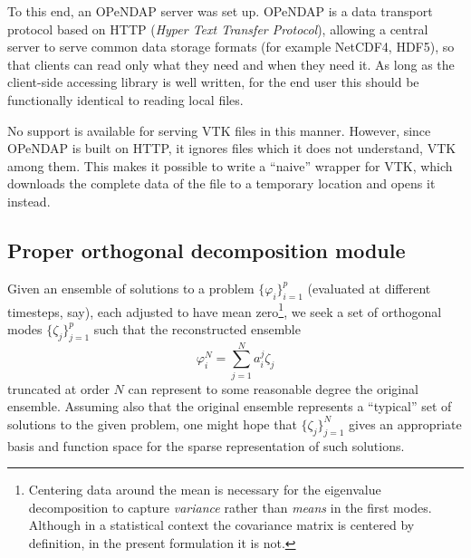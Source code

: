 \documentclass[3p,times,procedia]{elsarticle}
\begin{document}
To this end, an OPeNDAP server was set up. OPeNDAP is a data transport protocol
based on HTTP (\emph{Hyper Text Transfer Protocol}), allowing a central server
to serve common data storage formats (for example NetCDF4, HDF5), so that
clients can read only what they need and when they need it. As long as the
client-side accessing library is well written, for the end user this should be
functionally identical to reading local files.

No support is available for serving VTK files in this manner. However, since
OPeNDAP is built on HTTP, it ignores files which it does not understand, VTK
among them. This makes it possible to write a ``naive'' wrapper for VTK, which
downloads the complete data of the file to a temporary location and opens it
instead.

\subsection{Proper orthogonal decomposition module}

Given an ensemble of solutions to a problem $\{\varphi_i\}_{i=1}^{p}$ (evaluated
at different timesteps, say), each adjusted to have mean zero\footnote{Centering
data around the mean is necessary for the eigenvalue decomposition to capture
\emph{variance} rather than \emph{means} in the first modes. Although in a
statistical context the covariance matrix is centered by definition, in the
present formulation it is not.}, we seek a set of orthogonal modes
$\{\zeta_j\}_{j=1}^{p}$ such that the reconstructed ensemble
\[
  \varphi_i^N = \sum_{j=1}^N a_i^j \zeta_j
\]
truncated at order $N$ can represent to some reasonable degree the original
ensemble. Assuming also that the original ensemble represents a ``typical'' set
of solutions to the given problem, one might hope that $\{\zeta_j\}_{j=1}^{N}$
gives an appropriate basis and function space for the sparse representation of
such solutions.
\end{document}
